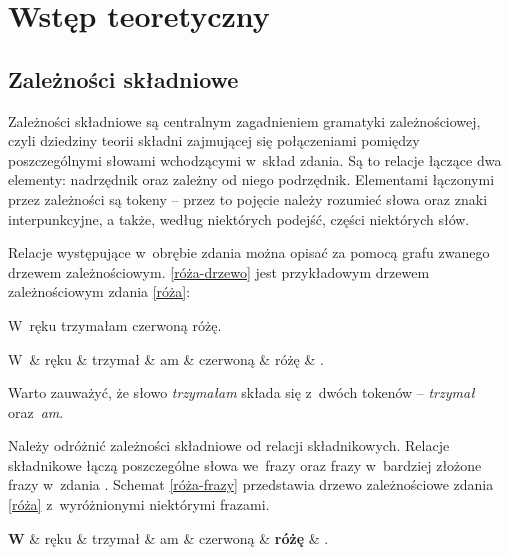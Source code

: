 \chapter{Wstęp teoretyczny} \label{ch2}
\section{Zależności składniowe}

Zależności składniowe są centralnym zagadnieniem gramatyki zależnościowej, czyli dziedziny teorii składni zajmującej się połączeniami pomiędzy poszczególnymi słowami wchodzącymi w~skład zdania. Są to relacje łączące dwa elementy: nadrzędnik oraz zależny od niego podrzędnik. Elementami łączonymi przez zależności są tokeny -- przez to pojęcie należy rozumieć słowa oraz znaki interpunkcyjne, a także, według niektórych podejść, części niektórych słów.

Relacje występujące w~obrębie zdania można opisać za pomocą grafu zwanego drzewem zależnościowym. \eqref{róża-drzewo} jest przykładowym drzewem zależnościowym zdania \eqref{róża}:

\begin{exe}
\ex \label{róża} W~ręku trzymałam czerwoną różę.\\ 
\ex \label{róża-drzewo}
\begin{dependency}[theme = simple, baseline=-\the\dimexpr\fontdimen22\textfont2\relax]
\begin{deptext}[column sep=1em]
W~\& ręku \& trzymał \& am \& czerwoną \& różę \& .  \\ 
\end{deptext}
\end{dependency}
\end{exe}

Warto zauważyć, że słowo \emph{trzymałam} składa się z~dwóch tokenów -- \emph{trzymał} oraz~\emph{am}.

Należy odróżnić zależności składniowe od relacji składnikowych. Relacje składnikowe łączą poszczególne słowa we~frazy oraz frazy w~bardziej złożone frazy w~zdania \citep{chomsky1956three}.
Schemat \eqref{róża-frazy} przedstawia drzewo zależnościowe zdania \eqref{róża} z~wyróżnionymi niektórymi frazami.

\begin{exe}
\ex \label{róża-frazy}
\begin{dependency}[theme=simple, baseline=-\the\dimexpr\fontdimen22\textfont2\relax]
\begin{deptext}[column sep=1em]
\textbf{W} \& ręku \& trzymał \& am \& czerwoną \& \textbf{różę} \& .  \\ 
\end{deptext}
\end{dependency}
\end{exe}

